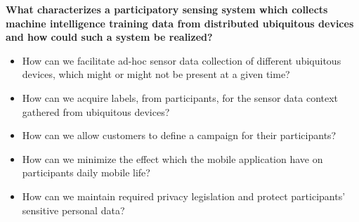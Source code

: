

\textbf{What characterizes a participatory sensing system which collects machine intelligence training data from distributed ubiquitous devices and how could such a system be realized?}

\begin{itemize}
    \item How can we facilitate ad-hoc sensor data collection of different ubiquitous devices, which might or might not be present at a given time?

    \item How can we acquire labels, from participants, for the sensor data context gathered from ubiquitous devices?  
    
    \item How can we allow customers to define a campaign for their participants?
    
    \item How can we minimize the effect which the mobile application have on participants daily mobile life?

    \item How can we maintain required privacy legislation and protect participants' sensitive personal data? 
\end{itemize}


